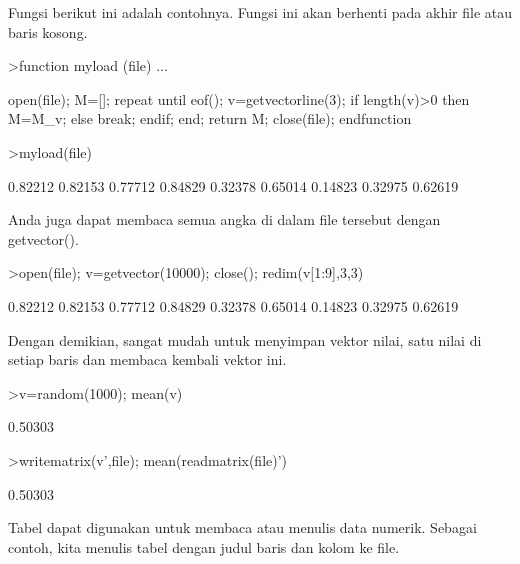 \documentclass[a4paper,10pt]{article}
\begin{document}
\begin{eulernotebook}
\begin{eulercomment}
\begin{eulercomment}
\begin{eulercomment}
\begin{eulercomment}
\begin{eulercomment}
Fungsi berikut ini adalah contohnya. Fungsi ini akan berhenti pada
akhir file atau baris kosong.
\end{eulercomment}
\begin{eulerprompt}
>function myload (file) ...
\end{eulerprompt}
\begin{eulerudf}
  open(file);
  M=[];
  repeat
     until eof();
     v=getvectorline(3);
     if length(v)>0 then M=M_v; else break; endif;
  end;
  return M;
  close(file);
  endfunction
\end{eulerudf}
\begin{eulerprompt}
>myload(file)
\end{eulerprompt}
\begin{euleroutput}
    0.82212   0.82153   0.77712 
    0.84829   0.32378   0.65014 
    0.14823   0.32975   0.62619 
\end{euleroutput}
\begin{eulercomment}
Anda juga dapat membaca semua angka di dalam file tersebut dengan
getvector().
\end{eulercomment}
\begin{eulerprompt}
>open(file); v=getvector(10000); close(); redim(v[1:9],3,3)
\end{eulerprompt}
\begin{euleroutput}
    0.82212   0.82153   0.77712 
    0.84829   0.32378   0.65014 
    0.14823   0.32975   0.62619 
\end{euleroutput}
\begin{eulercomment}
Dengan demikian, sangat mudah untuk menyimpan vektor nilai, satu nilai
di setiap baris dan membaca kembali vektor ini.
\end{eulercomment}
\begin{eulerprompt}
>v=random(1000); mean(v)
\end{eulerprompt}
\begin{euleroutput}
  0.50303
\end{euleroutput}
\begin{eulerprompt}
>writematrix(v',file); mean(readmatrix(file)')
\end{eulerprompt}
\begin{euleroutput}
  0.50303
\end{euleroutput}
\begin{eulercomment}
Tabel dapat digunakan untuk membaca atau menulis data numerik. Sebagai
contoh, kita menulis tabel dengan judul baris dan kolom ke file.
\end{eulercomment}

\end{eulercomment}
\end{eulercomment}
\end{eulercomment}
\end{eulercomment}
\end{eulernotebook}
\end{document}
